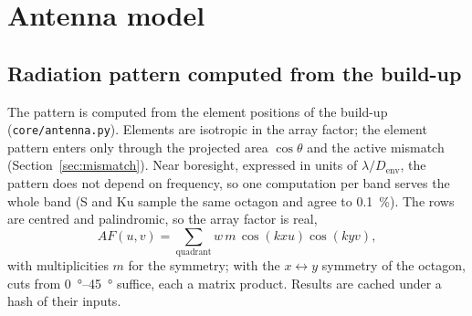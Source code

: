 \documentclass[11pt,a4paper]{article}
\newcommand{\code}[1]{\texttt{\small #1}}
\newcommand{\Denv}{D_{\mathrm{env}}}
\begin{document}
\section{Antenna model}

\subsection{Radiation pattern computed from the build-up}
The pattern is computed from the element positions of the build-up (\code{core/antenna.py}). Elements are isotropic in the array factor; the element pattern enters only through the
projected area $\cos\theta$ and the active mismatch (Section~\ref{sec:mismatch}). Near boresight, expressed in units
of $\lambda/\Denv$, the pattern does not depend on frequency, so one computation per band serves the whole band (S and
Ku sample the same octagon and agree to \SI{0.1}{\percent}). The rows are centred and palindromic, so the array factor
is real,
\[
  AF(u,v) = \sum_{\text{quadrant}} w\,m\,\cos(k x u)\cos(k y v),
\]
with multiplicities $m$ for the symmetry; with the $x\leftrightarrow y$ symmetry of the octagon, cuts from
\SIrange{0}{45}{\degree} suffice, each a matrix product. Results are cached under a hash of their inputs.
\end{document}
